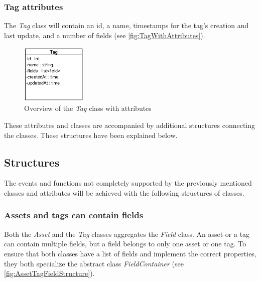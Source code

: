 \subsubsection{Tag attributes}
The \textit{Tag} class will contain an id, a name, timestamps for the tag's creation and last update, and a number of fields (see \autoref{fig:TagWithAttributes}).
\begin{figure}[H]
    \centering
    \includegraphics[width=0.28\textwidth]{figures/Classes/TagAttributes.png}
    \caption{Overview of the \textit{Tag} class with attributes}
    \label{fig:TagWithAttributes}
\end{figure}


These attributes and classes are accompanied by additional structures connecting the classes. These structures have been explained below.

\subsection{Structures}
The events and functions not completely supported by the previously mentioned classes and attributes will be achieved with the following structures of classes.

\subsubsection{Assets and tags can contain fields}
Both the \textit{Asset} and the \textit{Tag} classes aggregates the \textit{Field} class. An asset or a tag can contain multiple fields, but a field belongs to only one asset or one tag. To ensure that both classes have a list of fields and implement the correct properties, they both specialize the abstract class \textit{FieldContainer} (see \autoref{fig:AssetTagFieldStructure}).

